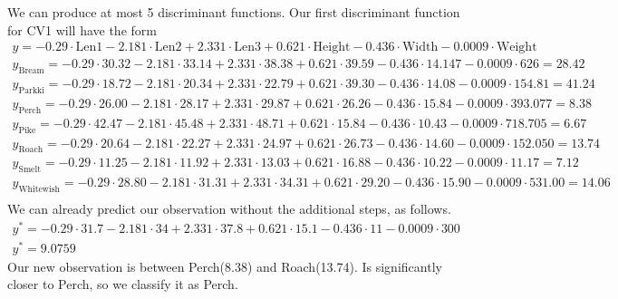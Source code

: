 \documentclass[openany]{article}
\begin{document}
		We can produce at most 5 discriminant functions. Our first discriminant function for CV1 will have the form
		\begin{align}
			y=-0.29\cdot\text{Len1}-2.181\cdot\text{Len2}+2.331\cdot\text{Len3}+0.621\cdot\text{Height}-0.436\cdot\text{Width}-0.0009\cdot\text{Weight}\\
			y_{\text{Bream}}=-0.29\cdot 30.32-2.181\cdot 33.14+2.331\cdot 38.38+0.621\cdot 39.59-0.436\cdot 14.147-0.0009\cdot 626 = 28.42\\
			y_{\text{Parkki}}=-0.29\cdot 18.72-2.181\cdot 20.34+2.331\cdot 22.79+0.621\cdot39.30-0.436\cdot 14.08-0.0009\cdot 154.81 = 41.24\\
			y_{\text{Perch}}=-0.29\cdot 26.00-2.181\cdot 28.17+2.331\cdot 29.87+0.621\cdot 26.26-0.436\cdot 15.84-0.0009\cdot 393.077 = 8.38\\
			y_{\text{Pike}}=-0.29\cdot 42.47-2.181\cdot 45.48+2.331\cdot 48.71+0.621\cdot 15.84-0.436\cdot 10.43-0.0009\cdot 718.705 = 6.67 \\
			y_{\text{Roach}}=-0.29\cdot 20.64-2.181\cdot 22.27+2.331\cdot 24.97 +0.621\cdot 26.73 -0.436\cdot 14.60 -0.0009\cdot 152.050 =13.74\\
			y_{\text{Smelt}}=-0.29\cdot 11.25 -2.181\cdot 11.92 +2.331\cdot 13.03 +0.621\cdot 16.88 -0.436\cdot 10.22 -0.0009\cdot 11.17 = 7.12\\
			y_{\text{Whitewish}}=-0.29\cdot 28.80-2.181\cdot 31.31 +2.331\cdot 34.31 +0.621\cdot 29.20 -0.436\cdot 15.90 -0.0009\cdot 531.00 = 14.06\\
		\end{align}
		We can already predict our observation without the additional steps, as follows.
		\begin{align}
			y^*=-0.29\cdot 31.7 -2.181\cdot 34 +2.331\cdot 37.8+0.621\cdot 15.1 -0.436\cdot 11-0.0009\cdot 300\\
			y^*=9.0759
		\end{align}
		Our new observation is between Perch(8.38) and Roach(13.74). Is significantly closer to Perch, so we classify it as Perch.
			
	
\end{document}
